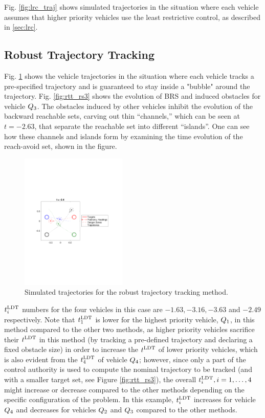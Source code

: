 Fig. \ref{fig:lrc_traj} shows simulated trajectories in the situation where each vehicle assumes that higher priority vehicles use the least restrictive control, as described in \ref{sec:lrc}.

\subsection{Robust Trajectory Tracking}
Fig. \ref{fig:rtt_traj} shows the vehicle trajectories in the situation where each vehicle tracks a pre-specified trajectory and is guaranteed to stay inside a "bubble" around the trajectory. Fig. \ref{fig:rtt_rs3} shows the evolution of BRS and induced obstacles for vehicle $Q_3$. The obstacles induced by other vehicles inhibit the evolution of the backward reachable sets, carving out thin “channels,” which can be seen at $t = -2.63$, that separate the reachable set into different “islands”. One can see how these channels and islands form by examining the time evolution of the reach-avoid set, shown in the figure.

\begin{figure}
  \centering
  \includegraphics[width=0.45\textwidth]{"fig/rtt_traj"}
  \caption{Simulated trajectories for the robust trajectory tracking method.}
  \label{fig:rtt_traj}
\end{figure}

$t^\text{LDT}_i$ numbers for the four vehicles in this case are $-1.63, -3.16, -3.63$ and $-2.49$ respectively. Note that $t^\text{LDT}_1$ is lower for the highest priority vehicle, $Q_1$, in this method compared to the other two methods, as higher priority vehicles sacrifice their $t^\text{LDT}$ in this method (by tracking a pre-defined trajectory and declaring a fixed obstacle size) in order to increase the $t^\text{LDT}$ of lower priority vehicles, which is also evident from the $t^\text{LDT}_4$ of vehicle $Q_4$; however, since only a part of the control authority is used to compute the nominal trajectory to be tracked (and with a smaller target set, see Figure \ref{fig:rtt_rs3}), the overall $t^\text{LDT}_i, i = 1, \ldots, 4$ might increase or decrease compared to the other methods depending on the specific configuration of the problem. In this example, $t^\text{LDT}_i$ increases for vehicle $Q_4$ and decreases for vehicles $Q_2$ and $Q_3$ compared to the other methods.     


